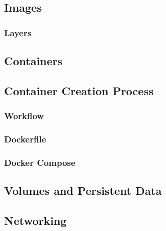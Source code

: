 \subsection{Images}
\label{sec::arch:images}
\subsubsection{Layers}

\subsection{Containers}
\label{sec::arch:containers}

\subsection{Container Creation Process}
\label{sec::arch:cont-creation}
\subsubsection{Workflow}
\subsubsection{Dockerfile}
\subsubsection{Docker Compose}

\subsection{Volumes and Persistent Data}
\label{sec::arch:volumes}

\subsection{Networking}
\label{sec::arch:net}